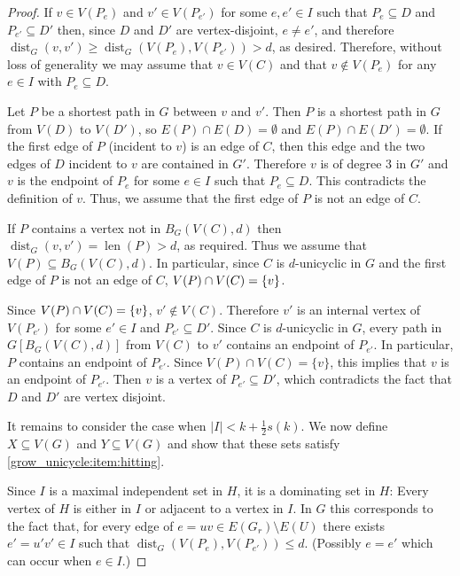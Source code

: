 \documentclass{patmorin}
\DeclareMathOperator{\len}{len}
\DeclareMathOperator{\dist}{dist}
\DeclarePairedDelimiter\set{\{}{\}}
\begin{document}
\begin{proof}
  
    If $v\in V(P_e)$ and $v'\in V(P_{e'})$ for some  $e,e' \in I$ such that $P_e\subseteq D$ and $P_{e'}\subseteq D'$ then, 
    since $D$ and $D'$ are vertex-disjoint, $e\neq e'$, and therefore 
    $\dist_G(v,v')\geq  \dist_G(V(P_e),V(P_{e'}))>d$, as desired.  Therefore, without loss of generality we may assume that $v\in V(C)$ and that $v\notin V(P_e)$ for any $e\in I$ with $P_e\subseteq D$.
    
    Let $P$ be a shortest path in $G$ between $v$ and $v'$.  Then $P$ is a shortest path in $G$ from $V(D)$ to $V(D')$, so $E(P)\cap E(D)=\emptyset$ and $E(P)\cap E(D')=\emptyset$.  If the first edge of $P$ (incident to $v$) is an edge of $C$, then this edge and the two edges of $D$ incident to $v$ are contained in $G'$. Therefore $v$ is of degree $3$ in $G'$ and $v$ is the endpoint of $P_e$ for some $e\in I$ such that $P_e\subseteq D$.  This contradicts the definition of $v$.
    Thus, we assume that the first edge of $P$ is not an edge of $C$. 
    
    If $P$ contains a vertex not in $B_G(V(C),d)$ then $\dist_G(v,v')=\len(P)>d$, as required.  Thus we assume that $V(P)\subseteq B_G(V(C),d)$.
    In particular, since $C$ is $d$-unicyclic in $G$ and the first edge of $P$ is not an edge of $C$, $V(P)\cap V(C)=\set{v}$. 
    
    Since $V(P)\cap V(C)=\set{v}$,  $v'\notin V(C)$.  Therefore $v'$ is an internal vertex of $V(P_{e'})$ for some $e'\in I$ and $P_{e'}\subseteq D'$.  Since $C$ is $d$-unicyclic in $G$, every path in $G[B_G(V(C),d)]$ from $V(C)$ to $v'$ contains an endpoint of $P_{e'}$.  In particular, $P$ contains an endpoint of $P_{e'}$.  Since $V(P)\cap V(C)=\{v\}$, this implies that $v$ is an endpoint of $P_{e'}$.  Then $v$ is a vertex of $P_{e'}\subseteq D'$, which contradicts the fact that $D$ and $D'$ are vertex disjoint.   
    
  It remains to consider the case when $|I| < k+\frac{1}{2}s(k)$.  We now define $X\subseteq V(G)$ and $Y\subseteq V(G)$ and show that these sets satisfy \cref{grow_unicycle:item:hitting}.  
  
  Since $I$ is a maximal independent set in $H$, it is a dominating set in $H$: Every vertex of $H$ is either in $I$ or adjacent to a vertex in $I$.  In $G$ this corresponds to the fact that, for every edge of $e=uv\in E(G_r)\setminus E(U)$ there exists $e'=u'v'\in I$ such that $\dist_G(V(P_{e}),V(P_{e'}))\le d$.  (Possibly $e=e'$ which can occur when $e\in I$.)


\end{proof}
\end{document}
